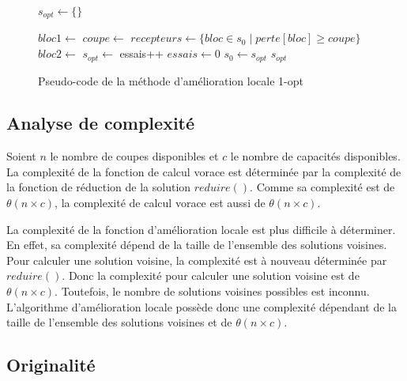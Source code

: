 \documentclass[10pt,a4paper]{article}
\begin{document}
\newpage

\begin{figure}[h!]
\begin{algorithmic}

	\State $s_{opt} \gets \{\}$
	
		\State $ bloc1 \gets $ 
		\State $ coupe \gets $ 
		\State $ recepteurs \gets \{bloc \in s_{0} \mid perte[bloc] \geq coupe\}$
		\State $ bloc2 \gets $   
		\State {}
		\State $s_{opt} \gets $ 
		\State {}
			\State essais++
		\Else
			\State $essais \gets 0$
			\State $s_{0} \gets s_{opt}$
		\EndIf
	\EndWhile
	\State \Return $s_{opt}$
\EndFunction

\end{algorithmic}
\caption{Pseudo-code de la méthode d'amélioration locale 1-opt}
\end{figure}

\subsection{Analyse de complexité}

Soient $n$ le nombre de coupes disponibles et $c$ le nombre de capacités disponibles.
La complexité de la fonction de calcul vorace est déterminée par la complexité de la fonction de réduction de la solution $reduire()$.
Comme sa complexité est de $\theta(n \times c)$, la complexité de calcul vorace est aussi de $\theta(n \times c)$.

La complexité de la fonction d'amélioration locale est plus difficile à déterminer. En effet, sa complexité dépend de la taille de l'ensemble des solutions voisines.
Pour calculer une solution voisine, la complexité est à nouveau déterminée par $reduire()$. Donc la complexité pour calculer une solution voisine est de $\theta(n \times c)$.
Toutefois, le nombre de solutions voisines possibles est inconnu. L'algorithme d'amélioration locale possède donc une complexité dépendant de la taille de l'ensemble des solutions voisines et de $\theta(n \times c)$.

\subsection{Originalité}
\end{document}
